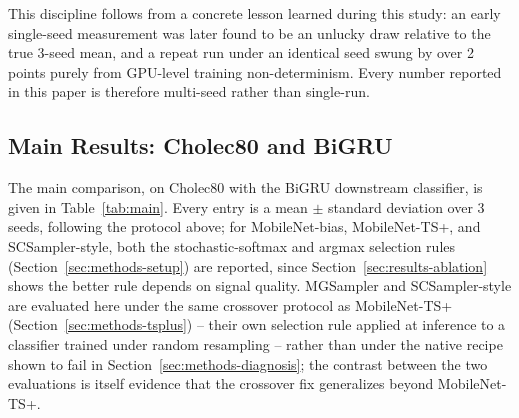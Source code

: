 \documentclass[preprint,12pt]{elsarticle}
\begin{document}
This discipline follows from a concrete lesson learned during this study: an early single-seed measurement was later found to be an unlucky draw relative to the true 3-seed mean, and a repeat run under an identical seed swung by over 2 points purely from GPU-level training non-determinism. Every number reported in this paper is therefore multi-seed rather than single-run.

\subsection{Main Results: Cholec80 and BiGRU}
\label{sec:results-main}

The main comparison, on Cholec80 with the BiGRU downstream classifier, is given in Table~\ref{tab:main}. Every entry is a mean $\pm$ standard deviation over 3 seeds, following the protocol above; for MobileNet-bias, MobileNet-TS+, and SCSampler-style, both the stochastic-softmax and argmax selection rules (Section~\ref{sec:methods-setup}) are reported, since Section~\ref{sec:results-ablation} shows the better rule depends on signal quality. MGSampler and SCSampler-style are evaluated here under the same crossover protocol as MobileNet-TS+ (Section~\ref{sec:methods-tsplus}) -- their own selection rule applied at inference to a classifier trained under random resampling -- rather than under the native recipe shown to fail in Section~\ref{sec:methods-diagnosis}; the contrast between the two evaluations is itself evidence that the crossover fix generalizes beyond MobileNet-TS+.
\end{document}

